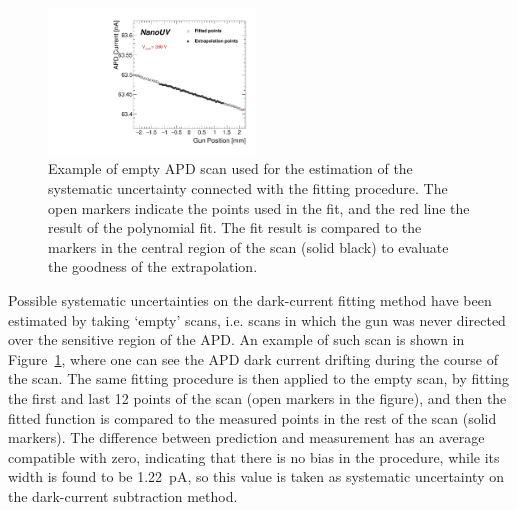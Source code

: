 \documentclass[12p]{paper}
\begin{document}
\begin{figure}[tb]
  \centering
\includegraphics[width=0.49\textwidth]{figures/apdSyst.pdf}
 \caption{Example of empty APD scan used for the estimation of the systematic uncertainty connected with the fitting procedure. The open markers indicate the points used in the fit, and the red line the result of the polynomial fit. The fit result is compared to the markers in the central region of the scan (solid black) to evaluate the goodness of the extrapolation.
  \label{fig:apd_syst}}
\end{figure}

Possible systematic uncertainties on the dark-current fitting method have been estimated by taking `empty' scans, i.e. scans in which the gun was never directed over the sensitive region of the APD. An example of such scan is shown in Figure~\ref{fig:apd_syst}, where one can see the APD dark current drifting during the course of the scan. The same fitting procedure is then applied to the empty scan, by fitting the first and last 12 points of the scan (open markers in the figure), and then the fitted function is compared to the measured points in the rest of the scan (solid markers). The difference between prediction and measurement has an average compatible with zero, indicating that there is no bias in the procedure, while its width is found to be 1.22~pA, so this value is taken as systematic uncertainty on the dark-current subtraction method. 
\end{document}
